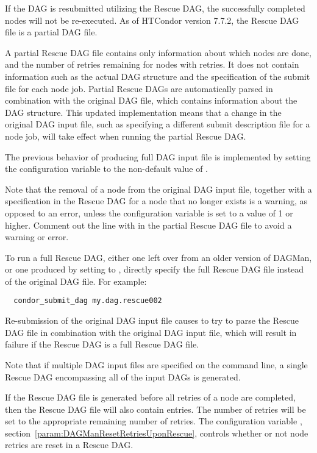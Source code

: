 If the DAG is resubmitted utilizing the Rescue DAG,
the successfully completed nodes will not be re-executed.
As of HTCondor version 7.7.2, the Rescue DAG file is a partial DAG file. 

A partial Rescue DAG file contains only information about which nodes are done,
and the number of retries remaining for nodes with retries.  
It does not contain information such as the actual
DAG structure and the specification of the submit file for each node job.  
Partial Rescue DAGs are automatically parsed in combination with
the original DAG file, 
which contains information about the DAG structure.  
This updated implementation means that a change in the original DAG input file,
such as specifying a different submit description file for a node job,
will take effect when running the partial Rescue DAG.

The previous behavior of producing full DAG input file 
is implemented by setting the configuration variable
 to the non-default 
value of .  

Note that the removal of a node from the original DAG input file, 
together with a  specification in the Rescue DAG 
for a node that no longer exists is a warning,
as opposed to an error, 
unless the  configuration
variable is set to a value of 1 or higher.  
Comment out the line with  in the partial Rescue DAG file
to avoid a warning or error.

To run a full Rescue DAG,
either one left over from an older version of DAGMan, 
or one produced by setting  
to , 
directly specify the full Rescue DAG file instead of the original DAG file.
For example:

\begin{verbatim}
  condor_submit_dag my.dag.rescue002
\end{verbatim}

Re-submission of the original DAG input file causes  to try to
parse the Rescue DAG file in combination with the original DAG input file, 
which will result in failure if the Rescue DAG is a full Rescue DAG file.

Note that if multiple DAG input files are specified on the
 command line,
a single Rescue DAG encompassing all of the input DAGs is generated.

If the Rescue DAG file is generated before all retries
of a node are completed, 
then the Rescue DAG file will also contain  entries.
The number of retries will be set to the appropriate remaining
number of retries.
The configuration variable , 
section~\ref{param:DAGManResetRetriesUponRescue},
controls whether or not node retries are reset in a Rescue DAG.

